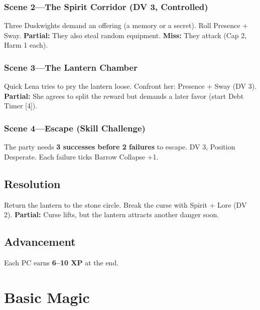 \documentclass[10pt,twocolumn]{article} %
\begin{document}
\subsubsection{Scene 2—The Spirit Corridor (DV 3, Controlled)}
Three Duskwights demand an offering (a memory or a secret). Roll Presence + Sway. \textbf{Partial:} They also steal random equipment. \textbf{Miss:} They attack (Cap 2, Harm 1 each).

\subsubsection{Scene 3—The Lantern Chamber}
Quick Lena tries to pry the lantern loose. Confront her: Presence + Sway (DV 3). \textbf{Partial:} She agrees to split the reward but demands a later favor (start Debt Timer [4]).

\subsubsection{Scene 4—Escape (Skill Challenge)}
The party needs \textbf{3 successes before 2 failures} to escape. DV 3, Position Desperate. Each failure ticks Barrow Collapse +1.

\subsection{Resolution}
Return the lantern to the stone circle. Break the curse with Spirit + Lore (DV 2). \textbf{Partial:} Curse lifts, but the lantern attracts another danger soon.

\subsection{Advancement}
Each PC earns \textbf{6–10 XP} at the end.

\section{Basic Magic}
\end{document}
